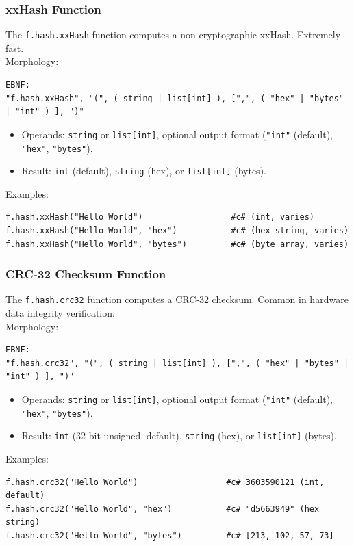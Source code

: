 \subsubsection{xxHash Function}
The \texttt{f.hash.xxHash} function computes a non-cryptographic xxHash. Extremely fast. \\
Morphology:
\begin{verbatim}
EBNF:
"f.hash.xxHash", "(", ( string | list[int] ), [",", ( "hex" | "bytes" | "int" ) ], ")"
\end{verbatim}
\begin{itemize}
\item Operands: \texttt{string} or \texttt{list[int]}, optional output format (\texttt{"int"} (default), \texttt{"hex"}, \texttt{"bytes"}).
\item Result: \texttt{int} (default), \texttt{string} (hex), or \texttt{list[int]} (bytes).
\end{itemize}
Examples:
\begin{verbatim}
f.hash.xxHash("Hello World")                  #c# (int, varies)
f.hash.xxHash("Hello World", "hex")           #c# (hex string, varies)
f.hash.xxHash("Hello World", "bytes")         #c# (byte array, varies)
\end{verbatim}

\subsubsection{CRC-32 Checksum Function}
The \texttt{f.hash.crc32} function computes a CRC-32 checksum. Common in hardware data integrity verification. \\
Morphology:
\begin{verbatim}
EBNF:
"f.hash.crc32", "(", ( string | list[int] ), [",", ( "hex" | "bytes" | "int" ) ], ")"
\end{verbatim}
\begin{itemize}
\item Operands: \texttt{string} or \texttt{list[int]}, optional output format (\texttt{"int"} (default), \texttt{"hex"}, \texttt{"bytes"}).
\item Result: \texttt{int} (32-bit unsigned, default), \texttt{string} (hex), or \texttt{list[int]} (bytes).
\end{itemize}
Examples:
\begin{verbatim}
f.hash.crc32("Hello World")                  #c# 3603590121 (int, default)
f.hash.crc32("Hello World", "hex")           #c# "d5663949" (hex string)
f.hash.crc32("Hello World", "bytes")         #c# [213, 102, 57, 73]
\end{verbatim}

